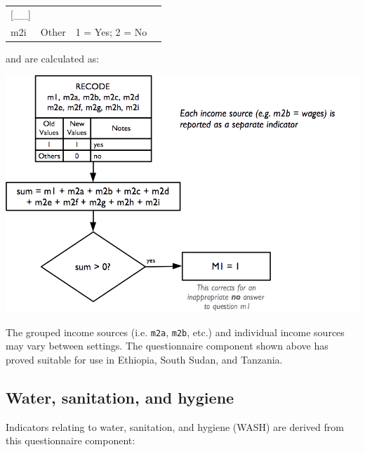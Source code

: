 \documentclass[12pt,a4paper]{book}
\theoremstyle{definition}
\theoremstyle{definition}
\theoremstyle{definition}
\theoremstyle{remark}
\begin{document}
\begin{longtable}[]{@{}llll@{}}
\begin{minipage}[t]{0.13\columnwidth}
{[}\_\_{]}\strut
\end{minipage}\tabularnewline
\begin{minipage}[t]{0.09\columnwidth}\raggedright
m2i\strut
\end{minipage} & \begin{minipage}[t]{0.41\columnwidth}\raggedright
Other\strut
\end{minipage} & \begin{minipage}[t]{0.25\columnwidth}\raggedright
1 = Yes; 2 = No\strut
\end{minipage} & \begin{minipage}[t]{0.13\columnwidth}\raggedright
\strut
\end{minipage}\tabularnewline
\bottomrule
\end{longtable}

and are calculated as:

\begin{center}\includegraphics{figures/indicators23} \end{center}

The grouped income sources (i.e. \texttt{m2a}, \texttt{m2b}, etc.) and
individual income sources may vary between settings. The questionnaire
component shown above has proved suitable for use in Ethiopia, South
Sudan, and Tanzania.

\hypertarget{water-sanitation-and-hygiene}{%
\subsection{Water, sanitation, and
hygiene}\label{water-sanitation-and-hygiene}}

Indicators relating to water, sanitation, and hygiene (WASH) are derived
from this questionnaire component:
\end{document}
